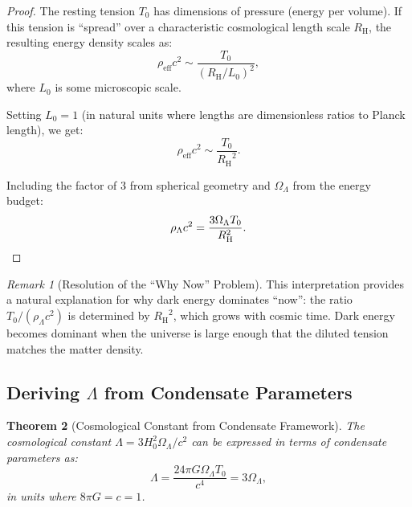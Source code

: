 \documentclass[11pt,a4paper]{article}
\newcommand{\Tzero}{\ensuremath{T_0}}
\newcommand{\RH}{\ensuremath{R_{\mathrm{H}}}}
\newcommand{\OmegaLam}{\ensuremath{\Omega_\Lambda}}
\newtheorem{theorem}{Theorem}[section]
\theoremstyle{definition}
\theoremstyle{remark}
\newtheorem{remark}[theorem]{Remark}
\begin{document}
\begin{proof}
The resting tension $\Tzero$ has dimensions of pressure (energy per volume). If this tension is ``spread'' over a characteristic cosmological length scale $\RH$, the resulting energy density scales as:
\begin{equation}
\rho_{\mathrm{eff}} c^2 \sim \frac{\Tzero}{(\RH/L_0)^2},
\end{equation}
where $L_0$ is some microscopic scale.

Setting $L_0 = 1$ (in natural units where lengths are dimensionless ratios to Planck length), we get:
\begin{equation}
\rho_{\mathrm{eff}} c^2 \sim \frac{\Tzero}{\RH^2}.
\end{equation}

Including the factor of 3 from spherical geometry and $\OmegaLam$ from the energy budget:
\begin{equation}
\rho_\Lambda c^2 = \frac{3\OmegaLam \Tzero}{\RH^2}. \qedhere
\end{equation}
\end{proof}

\begin{remark}[Resolution of the ``Why Now'' Problem]
This interpretation provides a natural explanation for why dark energy dominates ``now'': the ratio $\Tzero/(\rho_\Lambda c^2)$ is determined by $\RH^2$, which grows with cosmic time. Dark energy becomes dominant when the universe is large enough that the diluted tension matches the matter density.
\end{remark}

\subsection{Deriving $\Lambda$ from Condensate Parameters}
\label{sec:Lambda_derivation}

\begin{theorem}[Cosmological Constant from Condensate Framework]
\label{thm:Lambda_condensate}
The cosmological constant $\Lambda = 3H_0^2 \OmegaLam/c^2$ can be expressed in terms of condensate parameters as:
\begin{equation}
\label{eq:Lambda_condensate}
\boxed{\Lambda = \frac{24\pi G \OmegaLam \Tzero}{c^4} = 3\OmegaLam,}
\end{equation}
in units where $8\pi G = c = 1$.
\end{theorem}
\end{document}
